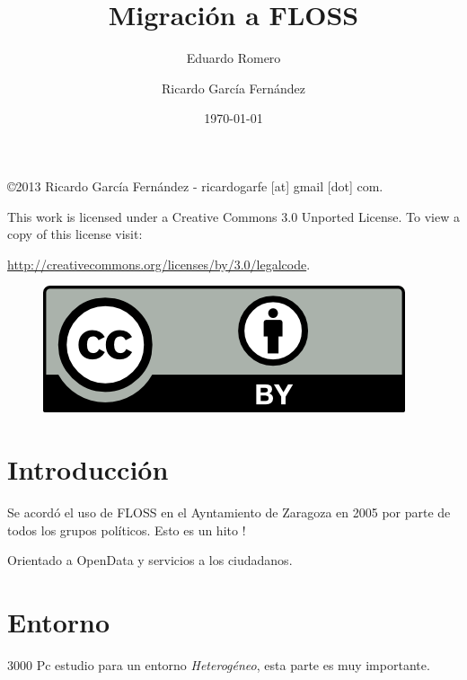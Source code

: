 \documentclass[11pt]{scrartcl}
\title{\textbf{Migraci\'on a FLOSS}}
\subtitle{Eduardo Romero}
\author{Ricardo Garc\'ia Fern\'andez}
\date{\today}
\begin{document}
\maketitle

\vfill

\begin{flushright}
    \copyright  2013 Ricardo Garc\'ia Fern\'andez - ricardogarfe [at] gmail [dot] com.

    This work is licensed under a Creative Commons 3.0 Unported License.
    To view a copy of this license visit:
 
    \url{http://creativecommons.org/licenses/by/3.0/legalcode}.
\end{flushright}

\begin{figure}[h]
    \begin{flushright}	
        \includegraphics{by}
        \label{fig:by}
    \end{flushright}
\end{figure}

\newpage

\section{Introducci\'on}
\label{sec:introduction}

\par Se acord\'o el uso de FLOSS en el Ayntamiento de Zaragoza en 2005 por parte de todos los grupos pol\'iticos. Esto es un hito !

\par Orientado a OpenData y servicios a los ciudadanos.


\section{Entorno}
\label{sec:entorno}

\par 3000 Pc estudio para un entorno \emph{Heterog\'eneo}, esta parte es muy importante.
\end{document}
